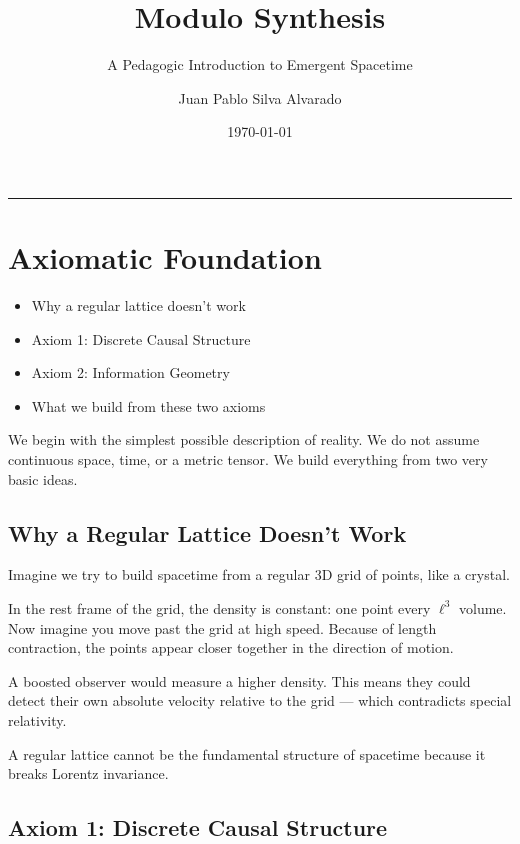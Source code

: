 \documentclass[11pt, a4paper, openany]{book}
\title{Modulo Synthesis}
\subtitle{A Pedagogic Introduction to Emergent Spacetime}
\author{Juan Pablo Silva Alvarado}
\date{\today}
\makeatletter
\newenvironment{introduction}[1][Chapter Overview]{%
  \begin{tcolorbox}[
    enhanced,
    colback=structurecolor!5,
    colframe=structurecolor,
    colbacktitle=structurecolor,
    coltitle=white,
    fonttitle=\bfseries,
    title={#1},
    arc=3pt, boxrule=1pt,
    left=10pt, right=10pt, top=8pt, bottom=8pt,
    before skip=15pt, after skip=15pt
  ]
  \begin{itemize}[leftmargin=*, itemsep=3pt]
}{%
  \end{itemize}
  \end{tcolorbox}
}
\gdef\@subtitle{}
\gdef\@extrainfo{}
\renewcommand{\maketitle}{%
  \begin{titlepage}
    \centering
    \vspace*{3cm}

    {\Huge\bfseries\color{structurecolor}\@title\par}
    \vspace{0.8cm}

    \ifx\@subtitle\empty\else
      {\Large\color{gray!80}\@subtitle\par}
    \fi
    \vspace{2cm}

    {\color{main}\rule{0.6\textwidth}{2pt}\par}
    \vspace{2cm}

    {\large\@author\par}
    \vspace{1cm}

    \vfill

    \ifx\@extrainfo\empty\else
      \begin{minipage}{0.75\textwidth}
        \centering
        \itshape\color{gray!70}\@extrainfo
      \end{minipage}
    \fi

    \vspace{1cm}
    {\normalsize\@date\par}

  \end{titlepage}
}
\makeatother
\begin{document}
\maketitle
\frontmatter
\tableofcontents

\mainmatter


\chapter{Axiomatic Foundation}

\begin{introduction}
  \item Why a regular lattice doesn't work
  \item Axiom 1: Discrete Causal Structure
  \item Axiom 2: Information Geometry
  \item What we build from these two axioms
\end{introduction}

We begin with the simplest possible description of reality.
We do not assume continuous space, time, or a metric tensor. We build everything from two very basic ideas.

\section{Why a Regular Lattice Doesn't Work}

Imagine we try to build spacetime from a regular 3D grid of points, like a crystal.

In the rest frame of the grid, the density is constant: one point every $\ell^3$ volume.
Now imagine you move past the grid at high speed. Because of length contraction, the points appear closer together in the direction of motion.

A boosted observer would measure a higher density.
This means they could detect their own absolute velocity relative to the grid --- which contradicts special relativity.

\begin{result}
A regular lattice cannot be the fundamental structure of spacetime because it breaks Lorentz invariance.
\end{result}

\section{Axiom 1: Discrete Causal Structure}
\end{document}

